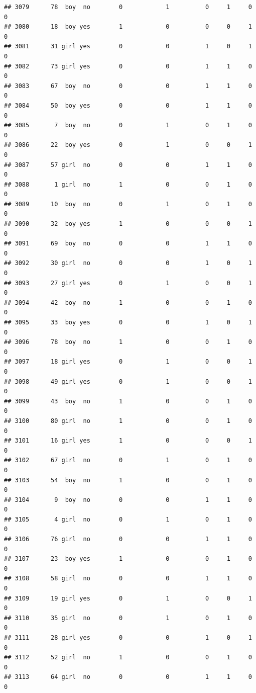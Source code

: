 \documentclass[man]{apa6}
\begin{document}
\begin{verbatim}
## 3079      78  boy  no        0            1          0     1     0     0
## 3080      18  boy yes        1            0          0     0     1     0
## 3081      31 girl yes        0            0          1     0     1     0
## 3082      73 girl yes        0            0          1     1     0     0
## 3083      67  boy  no        0            0          1     1     0     0
## 3084      50  boy yes        0            0          1     1     0     0
## 3085       7  boy  no        0            1          0     1     0     0
## 3086      22  boy yes        0            1          0     0     1     0
## 3087      57 girl  no        0            0          1     1     0     0
## 3088       1 girl  no        1            0          0     1     0     0
## 3089      10  boy  no        0            1          0     1     0     0
## 3090      32  boy yes        1            0          0     0     1     0
## 3091      69  boy  no        0            0          1     1     0     0
## 3092      30 girl  no        0            0          1     0     1     0
## 3093      27 girl yes        0            1          0     0     1     0
## 3094      42  boy  no        1            0          0     1     0     0
## 3095      33  boy yes        0            0          1     0     1     0
## 3096      78  boy  no        1            0          0     1     0     0
## 3097      18 girl yes        0            1          0     0     1     0
## 3098      49 girl yes        0            1          0     0     1     0
## 3099      43  boy  no        1            0          0     1     0     0
## 3100      80 girl  no        1            0          0     1     0     0
## 3101      16 girl yes        1            0          0     0     1     0
## 3102      67 girl  no        0            1          0     1     0     0
## 3103      54  boy  no        1            0          0     1     0     0
## 3104       9  boy  no        0            0          1     1     0     0
## 3105       4 girl  no        0            1          0     1     0     0
## 3106      76 girl  no        0            0          1     1     0     0
## 3107      23  boy yes        1            0          0     1     0     0
## 3108      58 girl  no        0            0          1     1     0     0
## 3109      19 girl yes        0            1          0     0     1     0
## 3110      35 girl  no        0            1          0     1     0     0
## 3111      28 girl yes        0            0          1     0     1     0
## 3112      52 girl  no        1            0          0     1     0     0
## 3113      64 girl  no        0            0          1     1     0     0

\end{verbatim}
\end{document}
